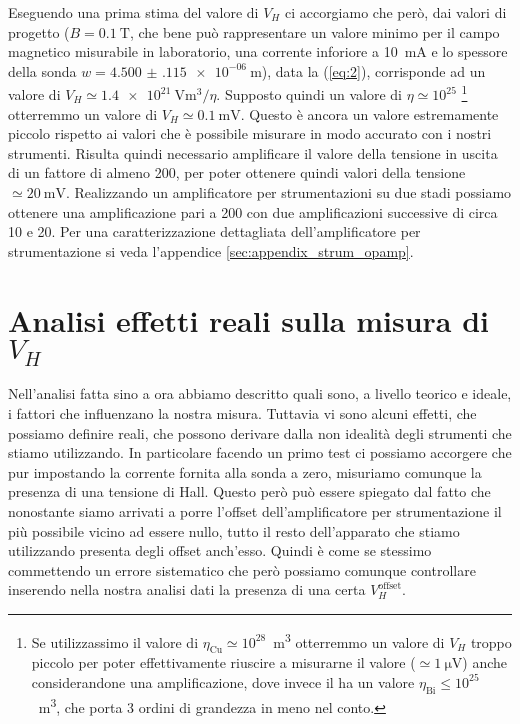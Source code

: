 \documentclass[
    prl,
    reprint, 
    superscriptaddress, 
    altaffilletter, 
    amsmath, 
    amssymb, 
    a4paper,
    varvw]{revtex4-2}
\begin{document}
Eseguendo una prima stima del valore di $V_H$ ci accorgiamo che però, dai valori di progetto ($B=\SI{0.1}{\tesla}$, che bene può rappresentare un valore minimo per il campo magnetico misurabile in laboratorio, una corrente inforiore a \SI{10}{\milli\ampere} e lo spessore della sonda $w=\SI{4.500(115)e-06}{\metre}$), data la (\ref{eq:2}), corrisponde ad un valore di $V_H \simeq\SI[exponent-mode = scientific]{1.4e21}{\volt\cubic\metre}/\eta$. Supposto quindi un valore di $\eta\simeq10^{25}$ \footnote{Se utilizzassimo il valore di $\eta_\text{Cu}\simeq10^{28}$\si{\per\cubic\metre} otterremmo un valore di $V_H$ troppo piccolo per poter effettivamente riuscire a misurarne il valore ($\simeq\SI{1}{\micro\volt}$) anche considerandone una amplificazione, dove invece il  ha un valore $\eta_\text{Bi}\leq10^{25}$ \si{\per\cubic\metre}, che porta 3 ordini di grandezza in meno nel conto.} otterremmo un valore di $V_H\simeq\SI{0.1}{\milli\volt}$. Questo è ancora un valore estremamente piccolo rispetto ai valori che è possibile misurare in modo accurato con i nostri strumenti. Risulta quindi necessario amplificare il valore della tensione in uscita di un fattore di almeno 200, per poter ottenere quindi valori della tensione $\simeq\SI{20}{\milli\volt}$. Realizzando un amplificatore per strumentazioni su due stadi possiamo ottenere una amplificazione pari a 200 con due amplificazioni successive di circa 10 e 20. Per una caratterizzazione dettagliata dell'amplificatore per strumentazione si veda l'appendice \ref{sec:appendix_strum_opamp}.

\section{Analisi effetti reali sulla misura di $V_H$}\label{sec:vlong}

Nell'analisi fatta sino a ora abbiamo descritto quali sono, a livello teorico e ideale, i fattori che influenzano la nostra misura. Tuttavia vi sono alcuni effetti, che possiamo definire reali, che possono derivare dalla non idealità degli strumenti che stiamo utilizzando. In particolare facendo un primo test ci possiamo accorgere che pur impostando la corrente fornita alla sonda a zero, misuriamo comunque la presenza di una tensione di Hall. Questo però può essere spiegato dal fatto che nonostante siamo arrivati a porre l'offset dell'amplificatore per strumentazione il più possibile vicino ad essere nullo, tutto il resto dell'apparato che stiamo utilizzando presenta degli offset anch'esso. Quindi è come se stessimo commettendo un errore sistematico che però possiamo comunque controllare inserendo nella nostra analisi dati la presenza di una certa $V_H^\text{offset}$. 
\end{document}

